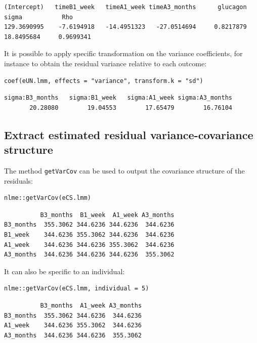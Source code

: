 \documentclass[12pt]{article}
\begin{document}
\begin{verbatim}
(Intercept)   timeB1_week   timeA1_week timeA3_months      glucagon         sigma           Rho 
129.3690995    -7.6194918   -14.4951323   -27.0514694     0.8217879    18.8495684     0.9699341
\end{verbatim}


It is possible to apply specific transformation on the variance
coefficients, for instance to obtain the residual variance relative to
each outcome:
\lstset{language=r,label= ,caption= ,captionpos=b,numbers=none}
\begin{lstlisting}
coef(eUN.lmm, effects = "variance", transform.k = "sd")
\end{lstlisting}

\begin{verbatim}
sigma:B3_months   sigma:B1_week   sigma:A1_week sigma:A3_months 
       20.28080        19.04553        17.65479        16.76104
\end{verbatim}

\subsection{Extract estimated residual variance-covariance structure}
\label{sec:orgad893ea}

The method \texttt{getVarCov} can be used to output the covariance structure of the residuals:
\lstset{language=r,label= ,caption= ,captionpos=b,numbers=none}
\begin{lstlisting}
nlme::getVarCov(eCS.lmm)
\end{lstlisting}

\begin{verbatim}
          B3_months  B1_week  A1_week A3_months
B3_months  355.3062 344.6236 344.6236  344.6236
B1_week    344.6236 355.3062 344.6236  344.6236
A1_week    344.6236 344.6236 355.3062  344.6236
A3_months  344.6236 344.6236 344.6236  355.3062
\end{verbatim}


It can also be specific to an individual:
\lstset{language=r,label= ,caption= ,captionpos=b,numbers=none}
\begin{lstlisting}
nlme::getVarCov(eCS.lmm, individual = 5)
\end{lstlisting}

\begin{verbatim}
          B3_months  A1_week A3_months
B3_months  355.3062 344.6236  344.6236
A1_week    344.6236 355.3062  344.6236
A3_months  344.6236 344.6236  355.3062
\end{verbatim}
\end{document}
